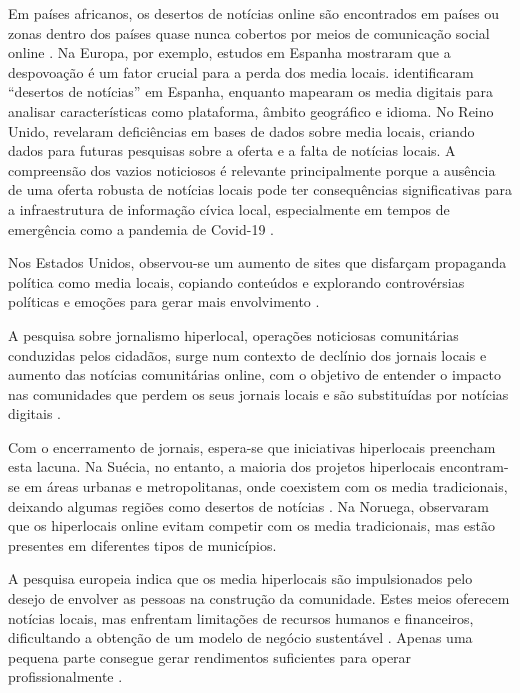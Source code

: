 \documentclass[portuguese]{textolivre}
\begin{document}
Em países africanos, os desertos de notícias online são encontrados em países ou zonas dentro dos países quase nunca cobertos por meios de comunicação social online \cite{madridmorales2023}. Na Europa, por exemplo, estudos em Espanha mostraram que a despovoação é um fator crucial para a perda dos media locais. \textcite{negreira-rey2023} identificaram “desertos de notícias” em Espanha, enquanto \textcite{negredo2023} mapearam os media digitais para analisar características como plataforma, âmbito geográfico e idioma. No Reino Unido, \textcite{bisiani2023} revelaram deficiências em bases de dados sobre media locais, criando dados para futuras pesquisas sobre a oferta e a falta de notícias locais. A compreensão dos vazios noticiosos é relevante principalmente porque a ausência de uma oferta robusta de notícias locais pode ter consequências significativas para a infraestrutura de informação cívica local, especialmente em tempos de emergência como a pandemia de Covid-19 \cite{battocchio2023}.

Nos Estados Unidos, observou-se um aumento de sites que disfarçam propaganda política como media locais, copiando conteúdos e explorando controvérsias políticas e emoções para gerar mais envolvimento \cite{karell2022}.


A pesquisa sobre jornalismo hiperlocal, operações noticiosas comunitárias conduzidas pelos cidadãos, surge num contexto de declínio dos jornais locais e aumento das notícias comunitárias online, com o objetivo de entender o impacto nas comunidades que perdem os seus jornais locais e são substituídas por notícias digitais \cite{harte2018}.

Com o encerramento de jornais, espera-se que iniciativas hiperlocais preencham esta lacuna. Na Suécia, no entanto, a maioria dos projetos hiperlocais encontram-se em áreas urbanas e metropolitanas, onde coexistem com os media tradicionais, deixando algumas regiões como desertos de notícias \cite{jangdal2019, nygren2018}. Na Noruega, \textcite{halvorsen2019} observaram que os hiperlocais online evitam competir com os media tradicionais, mas estão presentes em diferentes tipos de municípios.

A pesquisa europeia indica que os media hiperlocais são impulsionados pelo desejo de envolver as pessoas na construção da comunidade. Estes meios oferecem notícias locais, mas enfrentam limitações de recursos humanos e financeiros, dificultando a obtenção de um modelo de negócio sustentável \cite{hujanen2019, negreira-rey2022, tenor2019}. Apenas uma pequena parte consegue gerar rendimentos suficientes para operar profissionalmente \cite{halvorsen2019}.
\end{document}
